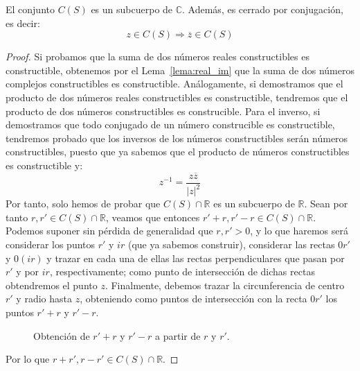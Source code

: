 \begin{prop}
    El conjunto $C(S)$ es un subcuerpo de $\mathbb{C}$. Además, es cerrado por conjugación, es decir:
    \begin{equation*}
        z\in C(S) \Longrightarrow \overline{z}\in C(S)
    \end{equation*}
    \begin{proof}
        Si probamos que la suma de dos números reales constructibles es constructible, obtenemos por el Lema~\ref{lema:real_im} que la suma de dos números complejos constructibles es constructible. Análogamente, si demostramos que el producto de dos números reales constructibles es constructible, tendremos que el producto de dos números constructibles es construcible. Para el inverso, si demostramos que todo conjugado de un número construcible es constructible, tendremos probado que los inversos de los números constructibles serán números constructibles, puesto que ya sabemos que el producto de números constructibles es constructible y:
        \begin{equation*}
            z^{-1} = \dfrac{z\overline{z}}{{|z|}^{2}}
        \end{equation*}
        Por tanto, solo hemos de probar que $C(S)\cap \mathbb{R}$ es un subcuerpo de $\mathbb{R}$. Sean por tanto $r,r'\in C(S)\cap \mathbb{R}$, veamos que entonces $r'+r, r'-r\in C(S)\cap \mathbb{R}$. Podemos suponer sin pérdida de generalidad que $r,r'>0$, y lo que haremos será considerar los puntos $r'$ y $ir$ (que ya sabemos construir), considerar las rectas $0r'$ y $0(ir)$ y trazar en cada una de ellas las rectas perpendiculares que pasan por $r'$ y por $ir$, respectivamente; como punto de intersección de dichas rectas obtendremos el punto $z$. Finalmente, debemos trazar la circunferencia de centro $r'$ y radio hasta $z$, obteniendo como puntos de intersección con la recta $0r'$ los puntos $r'+r$ y $r'-r$.
        \begin{figure}[H]
            \centering
            \caption{Obtención de $r'+r$ y $r'-r$ a partir de $r$ y $r'$.}
        \end{figure}
        Por lo que $r+r',r-r'\in C(S)\cap \mathbb{R}$.


\end{proof}
\end{prop}
